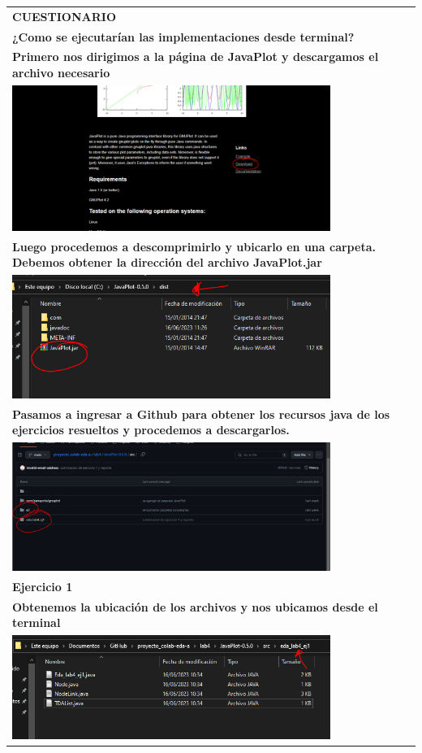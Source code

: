 \documentclass[9pt]{article}
\begin{document}
\begin{longtable}{|p{15cm}|}
		\textbf{CUESTIONARIO}\\
		\textbf{¿Como se ejecutarían las implementaciones desde terminal?}\\
		\textbf{Primero nos dirigimos a la página de JavaPlot y descargamos el archivo necesario}\\
		\includegraphics[width=0.8\textwidth,keepaspectratio]{img/descargajavaplot.PNG}\\
		\textbf{Luego procedemos a descomprimirlo y ubicarlo en una carpeta. Debemos obtener la dirección del archivo JavaPlot.jar }\\
		\includegraphics[width=0.8\textwidth,keepaspectratio]{img/javaplotJar.png}\\
		\textbf{Pasamos a ingresar a Github para obtener los recursos java de los ejercicios resueltos y procedemos a descargarlos.}\\
		\includegraphics[width=0.8\textwidth,keepaspectratio]{img/github.png}\\
		\textbf{Ejercicio 1
		}\\
		\textbf{Obtenemos la ubicación de los archivos y nos ubicamos desde el terminal
		}\\
		\includegraphics[width=0.8\textwidth,keepaspectratio]{img/carpeta1.png}\\

\end{longtable}
\end{document}
